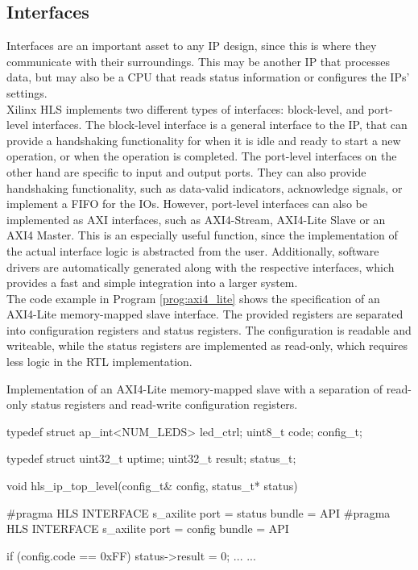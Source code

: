 \subsection{Interfaces}
\label{sec:hls:coding:interfaces}

Interfaces are an important asset to any IP design, since this is where they communicate with their surroundings.
This may be another IP that processes data, but may also be a CPU that reads status information or configures the IPs' settings.\\

Xilinx HLS implements two different types of interfaces: block-level, and port-level interfaces.
The block-level interface is a general interface to the IP, that can provide a handshaking functionality for when it is idle and ready to start a new operation, or when the operation is completed.
The port-level interfaces on the other hand are specific to input and output ports.
They can also provide handshaking functionality, such as data-valid indicators, acknowledge signals, or implement a FIFO for the IOs.
However, port-level interfaces can also be implemented as AXI interfaces, such as AXI4-Stream, AXI4-Lite Slave or an AXI4 Master.
This is an especially useful function, since the implementation of the actual interface logic is abstracted from the user.
Additionally, software drivers are automatically generated along with the respective interfaces, which provides a fast and simple integration into a larger system.\\

The code example in Program \ref{prog:axi4_lite} shows the specification of an AXI4-Lite memory-mapped slave interface.
The provided registers are separated into configuration registers and status registers.
The configuration is readable and writeable, while the status registers are implemented as read-only, which requires less logic in the RTL implementation.\\

\begin{program}
  \caption{Implementation of an AXI4-Lite memory-mapped slave with a separation of read-only status registers and read-write configuration registers.}
  \label{prog:axi4_lite}
\begin{CppCode}
 typedef struct {
   ap_int<NUM_LEDS> led_ctrl;
   uint8_t code;
 } config_t;

 typedef struct {
   uint32_t uptime;
   uint32_t result;
 } status_t;

 void hls_ip_top_level(config_t& config,
                       status_t* status) {
     #pragma HLS INTERFACE s_axilite port = status bundle = API
     #pragma HLS INTERFACE s_axilite port = config bundle = API

     if (config.code == 0xFF) {
       status->result = 0;
       ...
     }
     ...
 }
\end{CppCode}
\end{program}


